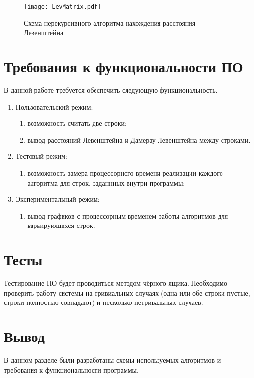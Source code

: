        	\begin{figure}[h!]
       		\centering
		\texttt{[image: LevMatrix.pdf]}
       		\caption{Схема нерекурсивного алгоритма нахождения расстояния Левенштейна}
       		\label{schema:matr:Levenstein}
       	\end{figure}\clearpage

    \section{Требования к функциональности ПО}
        В данной работе требуется обеспечить следующую функциональность.
        \begin{enumerate}
            \item Пользовательский режим:
            \begin{enumerate}
                \item возможность считать две строки;
                \item вывод расстояний Левенштейна и Дамерау-Левенштейна между строками.
            \end{enumerate}
	\item Тестовый режим: 
            \begin{enumerate}
            	\item возможность замера процессорного времени реализации каждого алгоритма для строк, заданнных внутри программы;
            \end{enumerate}
            \item Экспериментальный режим: 
            \begin{enumerate}
                \item вывод графиков с процессорным временем работы алгоритмов для варьирующихся строк.
            \end{enumerate}
        \end{enumerate}
        

    \section{Тесты}
    Тестирование ПО будет проводиться методом чёрного ящика. Необходимо проверить работу системы 
    на тривиальных случаях (одна или обе строки пустые, строки полностью совпадают) 
    и несколько нетривальных случаев.
  	

	\section*{Вывод}


	В данном разделе были разработаны схемы используемых алгоритмов и требования к функциональности программы.
\newpage